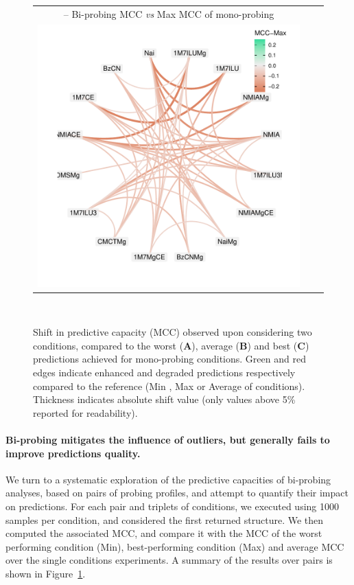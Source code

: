 \documentclass[a4,center,fleqn]{NAR}
\begin{document}
\begin{figure}
{\begin{tabular}{@{}c@{}c@{}c@{}}
			{\sf {\bfseries C} -- \relsize{-1}Bi-probing MCC \emph{vs} Max MCC of mono-probing}\\
			\includegraphics[width=\W\linewidth,trim=1cm 1cm .8cm .3cm,clip]{graphs/didy/MCC-vs-Max}\\
		\end{tabular}\\}
	\caption{Shift in \OurTool{} predictive capacity (MCC) observed upon considering two conditions, compared to the worst ({\sf\bfseries A}),  average ({\sf\bfseries B}) 
		and best ({\sf\bfseries C}) 
		predictions achieved for mono-probing conditions. Green and red edges indicate enhanced and degraded predictions respectively compared to the reference (Min%
		, Max 
		or Average of conditions). Thickness indicates absolute shift value (only values above 5\% reported for readability).\label{fig:pairwise}}
\end{figure}

\paragraph{Bi-probing mitigates the influence of outliers, but generally fails to improve predictions quality.}
We turn to a systematic exploration of the predictive capacities of bi-probing analyses, based on pairs of probing profiles, and attempt to quantify their impact on \OurTool predictions. For each pair and triplets of conditions, we executed \OurTool using 1000 samples per condition, and considered the first returned structure. We then computed the associated MCC, and compare it with the MCC of the worst performing condition (Min), best-performing condition (Max) and average MCC over the single conditions experiments. A summary of the results over pairs is shown in Figure~\ref{fig:pairwise}. 
\end{document}
